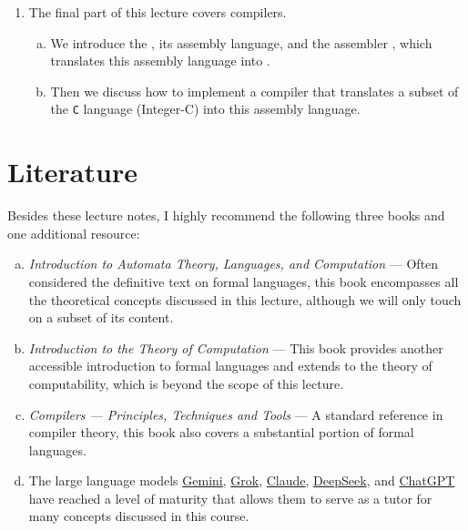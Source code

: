 \begin{enumerate}
\begin{enumerate}[(a)]
      and show how to implement a  for a given grammar.
\item Next, we talk about using  as a parser generator.  As examples, we implement a
      symbolic calculator and a program for symbolic differentiation.
\item Then we use  to implement an  for a small fragment of the programming
      language \texttt{C}.
\item Essential theory for understanding parsing algorithms is then presented, including the  and  (such as  and  parsers).
\end{enumerate}
\item The final part of this lecture covers compilers.
\begin{enumerate}[(a)]
\item We introduce the , its assembly language, and the assembler
      , which translates this assembly language into .
\item Then we discuss how to implement a compiler that translates a subset of the \texttt{C} language
      (Integer-C) into this assembly language.
\end{enumerate}
\end{enumerate}
\section{Literature}
Besides these lecture notes, I highly recommend the following three books and one additional resource:
\begin{enumerate}[(a)]
\item \emph{Introduction to Automata Theory, Languages, and Computation} \cite{hopcroft:06}
--- Often considered   the definitive text on formal languages, this book encompasses all the theoretical
concepts discussed in this lecture, although we will only touch on a subset of its content.
\item \emph{Introduction to the Theory of Computation} \cite{sipser:2012}
--- This book provides another accessible introduction to formal languages and extends to the theory of
computability, which is beyond the scope of this lecture.
\item \emph{Compilers --- Principles, Techniques and Tools} \cite{aho:2006}
--- A standard reference in compiler theory, this book also covers a substantial portion of formal languages.
\item The large language models \href{https://gemini.google.com/}{Gemini},
\href{https://grok.com/}{Grok}, \href{https://claude.ai/}{Claude}, \href{https://www.deepseek.com/}{DeepSeek},
and \href{https://chatgpt.com/}{ChatGPT} have reached a level of maturity
that allows them to serve as a tutor for many concepts discussed in this course.
\end{enumerate}

